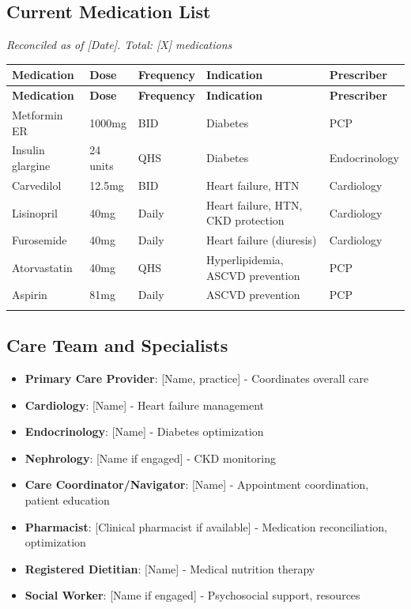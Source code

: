 \documentclass[11pt,letterpaper]{article}
\begin{document}
\subsection*{Current Medication List}

\textit{Reconciled as of [Date]. Total: [X] medications}

\begin{longtable}{|p{3cm}|p{2cm}|p{1.8cm}|p{3cm}|p{3.5cm}|}
\hline
\textbf{Medication} & \textbf{Dose} & \textbf{Frequency} & \textbf{Indication} & \textbf{Prescriber} \\ \hline
\endfirsthead
\hline
\textbf{Medication} & \textbf{Dose} & \textbf{Frequency} & \textbf{Indication} & \textbf{Prescriber} \\ \hline
\endhead
Metformin ER & 1000mg & BID & Diabetes & PCP \\ \hline
Insulin glargine & 24 units & QHS & Diabetes & Endocrinology \\ \hline
Carvedilol & 12.5mg & BID & Heart failure, HTN & Cardiology \\ \hline
Lisinopril & 40mg & Daily & Heart failure, HTN, CKD protection & Cardiology \\ \hline
Furosemide & 40mg & Daily & Heart failure (diuresis) & Cardiology \\ \hline
Atorvastatin & 40mg & QHS & Hyperlipidemia, ASCVD prevention & PCP \\ \hline
Aspirin & 81mg & Daily & ASCVD prevention & PCP \\ \hline
[Continue list] & & & & \\ \hline
\end{longtable}

\subsection*{Care Team and Specialists}

\begin{itemize}[leftmargin=*]
    \item \textbf{Primary Care Provider}: [Name, practice] - Coordinates overall care
    \item \textbf{Cardiology}: [Name] - Heart failure management
    \item \textbf{Endocrinology}: [Name] - Diabetes optimization
    \item \textbf{Nephrology}: [Name if engaged] - CKD monitoring
    \item \textbf{Care Coordinator/Navigator}: [Name] - Appointment coordination, patient education
    \item \textbf{Pharmacist}: [Clinical pharmacist if available] - Medication reconciliation, optimization
    \item \textbf{Registered Dietitian}: [Name] - Medical nutrition therapy
    \item \textbf{Social Worker}: [Name if engaged] - Psychosocial support, resources
\end{itemize}
\end{document}
